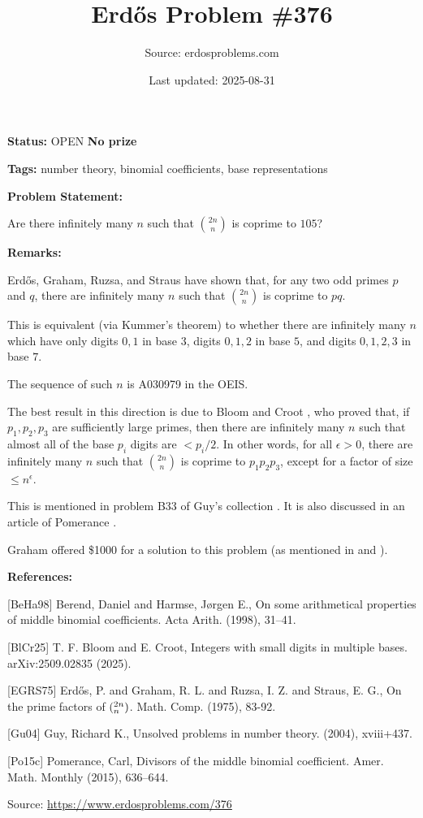 \documentclass{article}
\title{Erd\H{o}s Problem \#376}
\date{Last updated: 2025-08-31}
\author{Source: erdosproblems.com}
\begin{document}
\maketitle

\noindent\textbf{Status:} OPEN \quad \textbf{No prize}

\noindent\textbf{Tags:} number theory, binomial coefficients, base representations

\medskip
\noindent\textbf{Problem Statement:}

Are there infinitely many $n$ such that $\binom{2n}{n}$ is coprime to $105$?

\bigskip
\noindent\textbf{Remarks:}

Erd\H{o}s, Graham, Ruzsa, and Straus \cite{EGRS75} have shown that, for any two odd primes $p$ and $q$, there are infinitely many $n$ such that $\binom{2n}{n}$ is coprime to $pq$. 

This is equivalent (via Kummer's theorem) to whether there are infinitely many $n$ which have only digits $0,1$ in base $3$, digits $0,1,2$ in base $5$, and digits $0,1,2,3$ in base $7$.

The sequence of such $n$ is A030979 in the OEIS.

The best result in this direction is due to Bloom and Croot \cite{BlCr25}, who proved that, if $p_1,p_2,p_3$ are sufficiently large primes, then there are infinitely many $n$ such that almost all of the base $p_i$ digits are $<p_i/2$. In other words, for all $\epsilon>0$, there are infinitely many $n$ such that $\binom{2n}{n}$ is coprime to $p_1p_2p_3$, except for a factor of size $\leq n^\epsilon$.

This is mentioned in problem B33 of Guy's collection \cite{Gu04}. It is also discussed in an article of Pomerance \cite{Po15c}. 

Graham offered \$1000 for a solution to this problem (as mentioned in \cite{Gu04} and \cite{BeHa98}).

\bigskip
\noindent\textbf{References:}

[BeHa98] Berend, Daniel and Harmse, J\o rgen E., On some arithmetical properties of middle binomial
coefficients. Acta Arith. (1998), 31--41.
 
 [BlCr25] T. F. Bloom and E. Croot, Integers with small digits in multiple bases. arXiv:2509.02835 (2025).
 
 [EGRS75] Erd\H{o}s, P. and Graham, R. L. and Ruzsa, I. Z. and Straus, E. G., On the prime factors of $(\sp{2n}\sb{n})$. Math. Comp. (1975), 83-92.
 
 [Gu04] Guy, Richard K., Unsolved problems in number theory. (2004), xviii+437.
 
 [Po15c] Pomerance, Carl, Divisors of the middle binomial coefficient. Amer. Math. Monthly (2015), 636--644.

\bigskip
\noindent\small{Source: \url{https://www.erdosproblems.com/376}}
\end{document}
